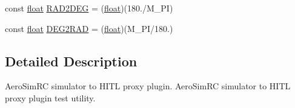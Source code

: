 \begin{DoxyCompactItemize}
\item 
const \hyperlink{_super_l_u_support_8h_a6a1bb6ed41f44b60e7bd83b0e9945aa7}{float} \hyperlink{group___aero_sim_r_c_gabb429aecc5bba8de3564e19ded7ef104}{R\-A\-D2\-D\-E\-G} = (\hyperlink{_super_l_u_support_8h_a6a1bb6ed41f44b60e7bd83b0e9945aa7}{float})(180./M\-\_\-\-P\-I)
\item 
const \hyperlink{_super_l_u_support_8h_a6a1bb6ed41f44b60e7bd83b0e9945aa7}{float} \hyperlink{group___aero_sim_r_c_gacbfd2fc3314cc3762ea0c3720979f8bc}{D\-E\-G2\-R\-A\-D} = (\hyperlink{_super_l_u_support_8h_a6a1bb6ed41f44b60e7bd83b0e9945aa7}{float})(M\-\_\-\-P\-I/180.)
\end{DoxyCompactItemize}


\subsection{Detailed Description}
Aero\-Sim\-R\-C simulator to H\-I\-T\-L proxy plugin. Aero\-Sim\-R\-C simulator to H\-I\-T\-L proxy plugin test utility.

